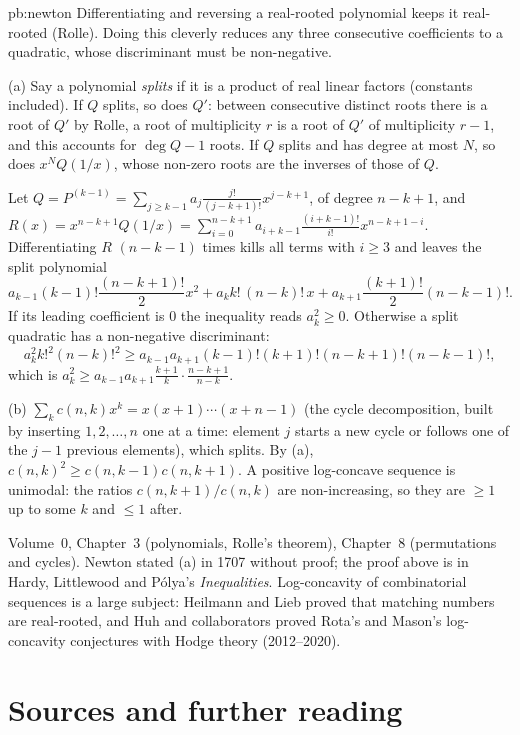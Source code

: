 \begin{solution}{pb:newton}
\idea Differentiating and reversing a real-rooted polynomial keeps it real-rooted (Rolle). Doing this cleverly reduces any three
consecutive coefficients to a quadratic, whose discriminant must be non-negative.

\writeup (a) Say a polynomial \emph{splits} if it is a product of real linear factors (constants included). If $Q$ splits, so does $Q'$:
between consecutive distinct roots there is a root of $Q'$ by Rolle, a root of multiplicity $r$ is a root of $Q'$ of multiplicity
$r-1$, and this accounts for $\deg Q-1$ roots. If $Q$ splits and has degree at most $N$, so does $x^NQ(1/x)$, whose non-zero roots are the
inverses of those of $Q$.

Let $Q=P^{(k-1)}=\sum_{j\ge k-1}a_j\frac{j!}{(j-k+1)!}x^{j-k+1}$, of degree $n-k+1$, and $R(x)=x^{n-k+1}Q(1/x)=\sum_{i=0}^{n-k+1}a_{i+k-1}\frac{(i+k-1)!}{i!}x^{n-k+1-i}$.
Differentiating $R$ $(n-k-1)$ times kills all terms with $i\ge3$ and leaves the split polynomial
\[
a_{k-1}(k-1)!\frac{(n-k+1)!}2x^2+a_kk!\,(n-k)!\,x+a_{k+1}\frac{(k+1)!}2(n-k-1)!.
\]
If its leading coefficient is $0$ the inequality reads $a_k^2\ge0$. Otherwise a split quadratic has a non-negative discriminant:
\[
a_k^2k!^2(n-k)!^2\ge a_{k-1}a_{k+1}(k-1)!(k+1)!(n-k+1)!(n-k-1)!,
\]
which is $a_k^2\ge a_{k-1}a_{k+1}\frac{k+1}k\cdot\frac{n-k+1}{n-k}$.

(b) $\sum_kc(n,k)x^k=x(x+1)\cdots(x+n-1)$ (the cycle decomposition, built by inserting $1,2,\dots,n$ one at a time: element $j$ starts a new
cycle or follows one of the $j-1$ previous elements), which splits. By (a), $c(n,k)^2\ge c(n,k-1)c(n,k+1)$. A positive log-concave
sequence is unimodal: the ratios $c(n,k+1)/c(n,k)$ are non-increasing, so they are $\ge1$ up to some $k$ and $\le1$ after.

\tools Volume~0, Chapter~3 (polynomials, Rolle's theorem), Chapter~8 (permutations and cycles).
\leads Newton stated (a) in 1707 without proof; the proof above is in Hardy, Littlewood and Pólya's \emph{Inequalities}. Log-concavity of
combinatorial sequences is a large subject: Heilmann and Lieb proved that matching numbers are real-rooted, and Huh and
collaborators proved Rota's and Mason's log-concavity conjectures with Hodge theory (2012--2020).
\end{solution}

\section*{Sources and further reading}

